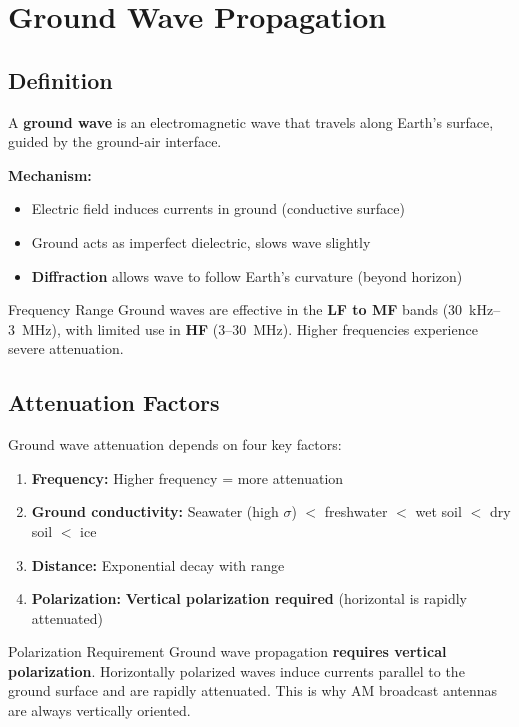 \section{Ground Wave Propagation}
\label{sec:ground-wave}

\subsection{Definition}

A \textbf{ground wave} is an electromagnetic wave that travels along Earth's surface, guided by the ground-air interface.

\textbf{Mechanism:}
\begin{itemize}
\item Electric field induces currents in ground (conductive surface)
\item Ground acts as imperfect dielectric, slows wave slightly
\item \textbf{Diffraction} allows wave to follow Earth's curvature (beyond horizon)
\end{itemize}

\begin{calloutbox}{Frequency Range}
Ground waves are effective in the \textbf{LF to MF} bands (30~kHz--3~MHz), with limited use in \textbf{HF} (3--30~MHz). Higher frequencies experience severe attenuation.
\end{calloutbox}

\subsection{Attenuation Factors}

Ground wave attenuation depends on four key factors:

\begin{enumerate}
\item \textbf{Frequency:} Higher frequency = more attenuation
\item \textbf{Ground conductivity:} Seawater (high $\sigma$) $<$ freshwater $<$ wet soil $<$ dry soil $<$ ice
\item \textbf{Distance:} Exponential decay with range
\item \textbf{Polarization:} \textbf{Vertical polarization required} (horizontal is rapidly attenuated)
\end{enumerate}

\begin{warningbox}{Polarization Requirement}
Ground wave propagation \textbf{requires vertical polarization}. Horizontally polarized waves induce currents parallel to the ground surface and are rapidly attenuated. This is why AM broadcast antennas are always vertically oriented.
\end{warningbox}

